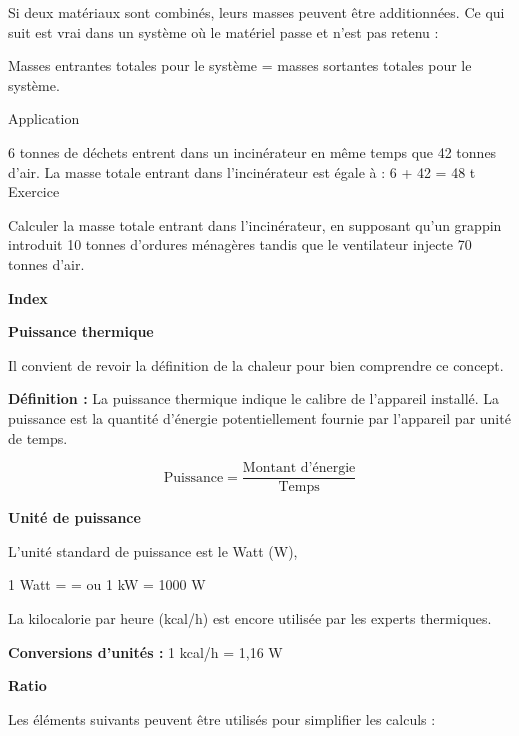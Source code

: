 Si deux matériaux sont combinés, leurs masses peuvent être additionnées. Ce qui suit est vrai dans un système où le matériel passe et n'est pas retenu :

Masses entrantes totales pour le système = masses sortantes totales pour le système.

\vspace{0.3cm}
Application
\vspace{0.3cm}

6 tonnes de déchets entrent dans un incinérateur en même temps que 42 tonnes d'air. 
La masse totale entrant dans l'incinérateur est égale à :
				6 + 42 = 48 t
\newpage
\vspace{0.3cm}
Exercice
\vspace{0.3cm}

Calculer la masse totale entrant dans l'incinérateur, en supposant qu'un grappin introduit 10 tonnes 
d'ordures ménagères tandis que le ventilateur injecte 70 tonnes d'air.

\textbf{Index}

\textbf{Puissance thermique}


Il convient de revoir la définition de la chaleur pour bien comprendre ce concept.
\vspace{0.3cm}

\textbf{Définition :} La puissance thermique indique le calibre de l'appareil installé. La puissance est la quantité d'énergie potentiellement fournie par l'appareil par unité de temps.
 \vspace{0.3cm}

\begin{equation}
    \text{Puissance} = \frac{\text{Montant d'énergie}}{\text{Temps}}
\end{equation}


\textbf{Unité de puissance}

\vspace{0.3cm}
L'unité standard de puissance est le Watt (W), 

1 Watt = = ou 1 kW = 1000 W 

\vspace{0.3cm}
La kilocalorie par heure (kcal/h) est encore utilisée par les experts thermiques.

\textbf{Conversions d'unités :}
\vspace{0.3cm}
1 kcal/h = 1,16 W


\textbf{Ratio}
\vspace{0.3cm}


Les éléments suivants peuvent être utilisés pour simplifier les calculs :



